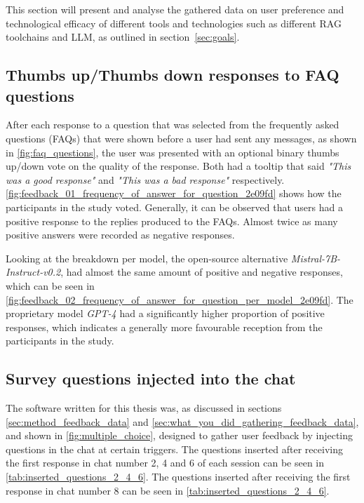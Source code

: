 This section will present and analyse the gathered data on user preference and technological efficacy of different tools and technologies such as different \gls{RAG} toolchains and \gls{LLM}, as outlined in section~\ref{sec:goals}.


\subsection{Thumbs up/Thumbs down responses to FAQ questions}


After each response to a question that was selected from the frequently asked questions (FAQs) that were shown before a user had sent any messages, as shown in \autoref{fig:faq_questions}, the user was presented with an optional binary thumbs up/down vote on the quality of the response. Both had a tooltip that said \textit{"This was a good response"} and \textit{"This was a bad response"} respectively. \autoref{fig:feedback_01_frequency_of_answer_for_question_2e09fd} shows how the participants in the study voted. Generally, it can be observed that users had a positive response to the replies produced to the FAQs. Almost twice as many positive answers were recorded as negative responses.


Looking at the breakdown per model, the open-source alternative \textit{Mistral-7B-Instruct-v0.2}, had almost the same amount of positive and negative responses, which can be seen in \autoref{fig:feedback_02_frequency_of_answer_for_question_per_model_2e09fd}. The proprietary model \textit{GPT-4} had a significantly higher proportion of positive responses, which indicates a generally more favourable reception from the participants in the study.








\subsection{Survey questions injected into the chat}
\label{sec:survey_questions_injected_into_the_chat}


The software written for this thesis was, as discussed in sections \ref{sec:method_feedback_data} and \ref{sec:what_you_did_gathering_feedback_data}, and shown in \autoref{fig:multiple_choice}, designed to gather user feedback by injecting questions in the chat at certain triggers. The questions inserted after receiving the first response in chat number 2, 4 and 6 of each session can be seen in \autoref{tab:inserted_questions_2_4_6}. The questions inserted after receiving the first response in chat number 8 can be seen in \autoref{tab:inserted_questions_2_4_6}.


